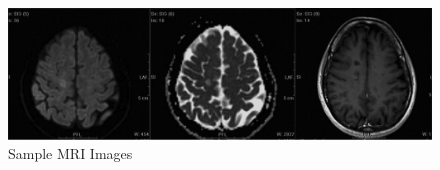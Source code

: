 \begin{figure}
    \centerline{\includegraphics[width=1\columnwidth]{02-related-works/figures/sample-mri-images.png}}
    \caption{Sample MRI Images \cite{lovblad2010mr}}
    \label{fig:sample-mri-images}
\end{figure}